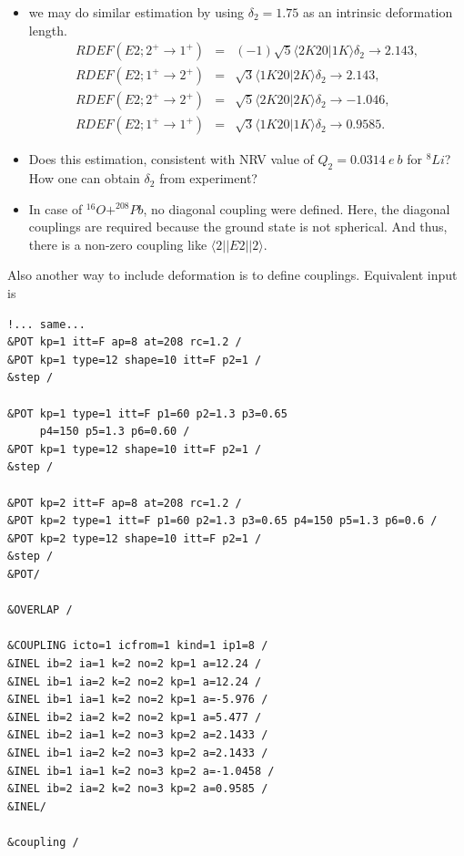 \documentclass[11pt]{book}
\def\la{\langle}
\def\ra{\rangle}
\newcommand{\bea}{\begin{eqnarray}}
\newcommand{\eea}{\end{eqnarray}}
\newcommand{\no}{\nonumber \\}
\begin{document}
\begin{itemize}
\item we may do similar estimation by using 
      $\delta_2=1.75$ as an intrinsic deformation length.       
      \bea 
       RDEF(E2;2^+\to 1^+)
              &=&(-1)\sqrt{5}\la 2 K 20|1K\ra \delta_2\to 2.143,\no 
       RDEF(E2;1^+\to 2^+)
                     &=&\sqrt{3}\la 1 K 20|2K\ra \delta_2\to 2.143,\no        
       RDEF(E2;2^+\to 2^+)&=&\sqrt{5}\la 2 K 20|2K\ra \delta_2\to -1.046,\no
       RDEF(E2;1^+\to 1^+)&=&\sqrt{3}\la 1 K 20|1K\ra \delta_2
       \to 0.9585.
      \eea 
 
\item {\color{blue} Does this estimation, consistent with NRV value of
 $Q_2=0.0314 \ e\ b$ for $^8Li$? 
 How one can obtain $\delta_2$ from experiment?
 } 
 \item In case of $^{16}O+^{208}Pb$, no diagonal coupling were defined. 
       Here, the diagonal couplings are required because the ground state is not spherical. And thus, there is a non-zero coupling like $\la 2||E2||2\ra $. 
             
\end{itemize}
Also another way to include deformation is to define couplings.
Equivalent input is
\begin{small} 
\begin{lstlisting}[frame=single]
!... same...
&POT kp=1 itt=F ap=8 at=208 rc=1.2 /
&POT kp=1 type=12 shape=10 itt=F p2=1 /
&step /

&POT kp=1 type=1 itt=F p1=60 p2=1.3 p3=0.65
     p4=150 p5=1.3 p6=0.60 /
&POT kp=1 type=12 shape=10 itt=F p2=1 /
&step /

&POT kp=2 itt=F ap=8 at=208 rc=1.2 /
&POT kp=2 type=1 itt=F p1=60 p2=1.3 p3=0.65 p4=150 p5=1.3 p6=0.6 /
&POT kp=2 type=12 shape=10 itt=F p2=1 /
&step /
&POT/

&OVERLAP /

&COUPLING icto=1 icfrom=1 kind=1 ip1=8 /          
&INEL ib=2 ia=1 k=2 no=2 kp=1 a=12.24 /            
&INEL ib=1 ia=2 k=2 no=2 kp=1 a=12.24 /
&INEL ib=1 ia=1 k=2 no=2 kp=1 a=-5.976 /
&INEL ib=2 ia=2 k=2 no=2 kp=1 a=5.477 /
&INEL ib=2 ia=1 k=2 no=3 kp=2 a=2.1433 /
&INEL ib=1 ia=2 k=2 no=3 kp=2 a=2.1433 /
&INEL ib=1 ia=1 k=2 no=3 kp=2 a=-1.0458 /
&INEL ib=2 ia=2 k=2 no=3 kp=2 a=0.9585 /
&INEL/

&coupling /
\end{lstlisting}
\end{small} 
\end{document}
